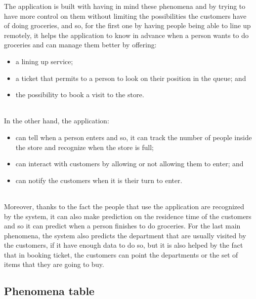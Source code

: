The application is built with having in mind these phenomena and by trying to have more control on them without limiting the possibilities the customers have of doing groceries, and so, for the first one by having people being able to line up remotely, it helps the application to know in advance when a person wants to do groceries and can manage them better by offering:
\begin{itemize}
    \item a lining up service;
    \item a ticket that permits to a person to look on their position in the queue; and
    \item the possibility to book a visit to the store.
\end{itemize}
\ \\
In the other hand, the application:
\begin{itemize}
    \item can tell when a person enters and so, it can track the number of people inside the store and recognize when the store is full;
    \item can interact with customers by allowing or not allowing them to enter; and
    \item can notify the customers when it is their turn to enter.
\end{itemize}
\ \\
Moreover, thanks to the fact the people that use the application are recognized by the system, it can also make prediction on the residence time of the customers and so it can predict when a person finishes to do groceries.
For the last main phenomena, the system also predicts the department that are usually visited by the customers, if it have enough data to do so, but it is also helped by the fact that in booking ticket, the customers can point the departments or the set of items that they are going to buy.

\subsection{Phenomena table}


